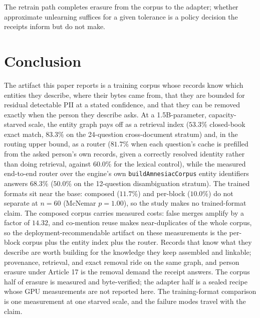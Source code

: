 \documentclass{article}
\begin{document}
The retrain path completes erasure from the corpus to the adapter; whether approximate unlearning suffices for a given tolerance is a policy decision the receipts inform but do not make.

\section{Conclusion}
\label{sec:conclusion}

The artifact this paper reports is a training corpus whose records know which entities they describe, where their bytes came from, that they are bounded for residual detectable PII at a stated confidence, and that they can be removed exactly when the person they describe asks. At a 1.5B-parameter, capacity-starved scale, the entity graph pays off as a retrieval index ($53.3\%$ closed-book exact match, $83.3\%$ on the 24-question cross-document stratum) and, in the routing upper bound, as a router ($81.7\%$ when each question's cache is prefilled from the asked person's own records, given a correctly resolved identity rather than doing retrieval, against $60.0\%$ for the lexical control), while the measured end-to-end router over the engine's own \texttt{buildAmnesiacCorpus} entity identifiers answers $68.3\%$ ($50.0\%$ on the 12-question disambiguation stratum). The trained formats sit near the base: composed ($11.7\%$) and per-block ($10.0\%$) do not separate at $n{=}60$ (McNemar $p{=}1.00$), so the study makes no trained-format claim. The composed corpus carries measured costs: false merges amplify by a factor of $14.32$, and co-mention reuse makes near-duplicates of the whole corpus, so the deployment-recommendable artifact on these measurements is the per-block corpus plus the entity index plus the router. Records that know what they describe are worth building for the knowledge they keep assembled and linkable; provenance, retrieval, and exact removal ride on the same graph, and person erasure under Article 17 is the removal demand the receipt answers. The corpus half of erasure is measured and byte-verified; the adapter half is a sealed recipe whose GPU measurements are not reported here. The training-format comparison is one measurement at one starved scale, and the failure modes travel with the claim.



\end{document}
